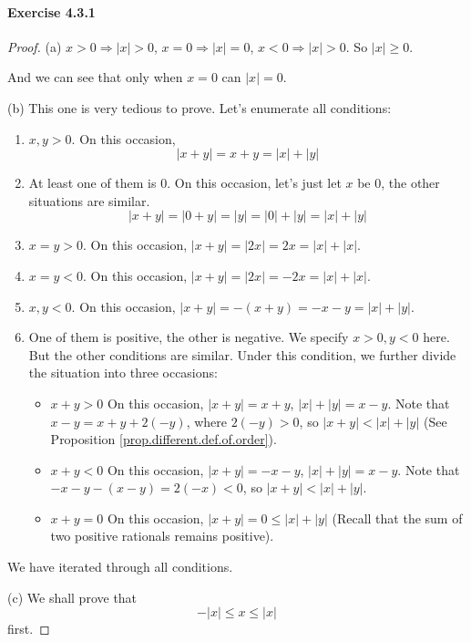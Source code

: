 \paragraph{Exercise 4.3.1} \label{exercise4.3.1}
\begin{proof}
(a)
$x>0 \Rightarrow |x| >0$, $x=0\Rightarrow |x|=0$, $x<0 \Rightarrow |x| >0$. So $|x| \geq 0$.

And we can see that only when $x=0$ can $|x| = 0$.

(b)
This one is very tedious to prove. Let's enumerate all conditions:
\begin{enumerate}
\item $x,y>0$. On this occasion, 
\[
|x+y| = x+y = |x|+|y|
\]

\item At least one of them is $0$. On this occasion, let's just let $x$ be 0, the other 
situations are similar.
\[
|x+y| = |0+y| = |y| = |0| + |y| = |x| + |y|
\]

\item $x=y>0$. On this occasion, $|x+y| = |2x| = 2x = |x|+|x|$.

\item $x=y<0$. On this occasion, $|x+y| = |2x| = -2x = |x|+|x|$.

\item $x,y<0$. On this occasion, $|x+y| = -(x+y) = -x -y = |x| + |y|$.

\item One of them is positive, the other is negative. We specify $x>0,y<0$ here. But the other conditions 
are similar. Under this condition, we further divide the situation into three occasions:
\begin{itemize}
\item $x+y>0$ On this occasion, $|x+y| = x+y$, $|x| + |y| = x-y$. Note that $x-y = x+y +2(-y)$, where 
$2(-y) >0$, so $|x+y| < |x|+|y|$ (See Proposition \ref{prop.different.def.of.order}).
\item $x+y<0$ On this occasion, $|x+y| = -x-y$, $|x|+|y|=x-y$. Note that $-x-y - (x-y) = 2(-x) < 0$, so 
$|x+y| < |x| + |y|$.
\item $x+y=0$ On this occasion, $|x+y| = 0 \leq |x| + |y|$ (Recall that the sum of two positive rationals 
remains positive).
\end{itemize}
\end{enumerate}

We have iterated through all conditions.

(c)
We shall prove that 
\[
-|x| \leq x \leq |x|
\]
first.


\end{proof}
